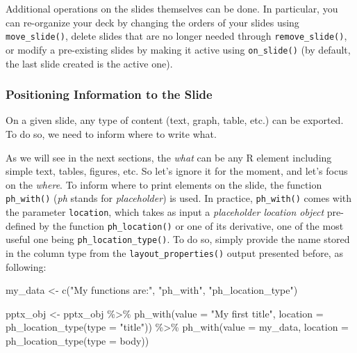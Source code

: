 \documentclass[
]{book}
\newenvironment{Shaded}{\begin{snugshade}}{\end{snugshade}}
\newcommand{\AttributeTok}[1]{\textcolor[rgb]{0.77,0.63,0.00}{#1}}
\newcommand{\FunctionTok}[1]{\textcolor[rgb]{0.00,0.00,0.00}{#1}}
\newcommand{\NormalTok}[1]{#1}
\newcommand{\OtherTok}[1]{\textcolor[rgb]{0.56,0.35,0.01}{#1}}
\newcommand{\SpecialCharTok}[1]{\textcolor[rgb]{0.00,0.00,0.00}{#1}}
\newcommand{\StringTok}[1]{\textcolor[rgb]{0.31,0.60,0.02}{#1}}
\begin{document}
Additional operations on the slides themselves can be done. In particular, you can re-organize your deck by changing the orders of your slides using \texttt{move\_slide()}, delete slides that are no longer needed through \texttt{remove\_slide()}, or modify a pre-existing slides by making it active using \texttt{on\_slide()} (by default, the last slide created is the active one).

\hypertarget{positioning-information-to-the-slide}{%
\subsubsection{Positioning Information to the Slide}\label{positioning-information-to-the-slide}}

On a given slide, any type of content (text, graph, table, etc.) can be exported. To do so, we need to inform where to write what.

As we will see in the next sections, the \emph{what} can be any R element including simple text, tables, figures, etc. So let's ignore it for the moment, and let's focus on the \emph{where}.
To inform where to print elements on the slide, the function \texttt{ph\_with()} (\emph{ph} stands for \emph{placeholder}) is used. In practice, \texttt{ph\_with()} comes with the parameter \texttt{location}, which takes as input a \emph{placeholder location object} pre-defined by the function \texttt{ph\_location()} or one of its derivative, one of the most useful one being \texttt{ph\_location\_type()}. To do so, simply provide the name stored in the column type from the \texttt{layout\_properties()} output presented before, as following:

\begin{Shaded}
\begin{Highlighting}[]
\NormalTok{my\_data }\OtherTok{\textless{}{-}} \FunctionTok{c}\NormalTok{(}\StringTok{"My functions are:"}\NormalTok{, }\StringTok{"ph\_with"}\NormalTok{, }\StringTok{"ph\_location\_type"}\NormalTok{)}

\NormalTok{pptx\_obj }\OtherTok{\textless{}{-}}\NormalTok{ pptx\_obj }\SpecialCharTok{\%\textgreater{}\%}
  \FunctionTok{ph\_with}\NormalTok{(}\AttributeTok{value =} \StringTok{"My first title"}\NormalTok{, }\AttributeTok{location =} \FunctionTok{ph\_location\_type}\NormalTok{(}\AttributeTok{type =} \StringTok{"title"}\NormalTok{)) }\SpecialCharTok{\%\textgreater{}\%} 
  \FunctionTok{ph\_with}\NormalTok{(}\AttributeTok{value =}\NormalTok{ my\_data, }\AttributeTok{location =} \FunctionTok{ph\_location\_type}\NormalTok{(}\AttributeTok{type =} \StringTok{\textquotesingle{}body\textquotesingle{}}\NormalTok{))}
\end{Highlighting}
\end{Shaded}
\end{document}

